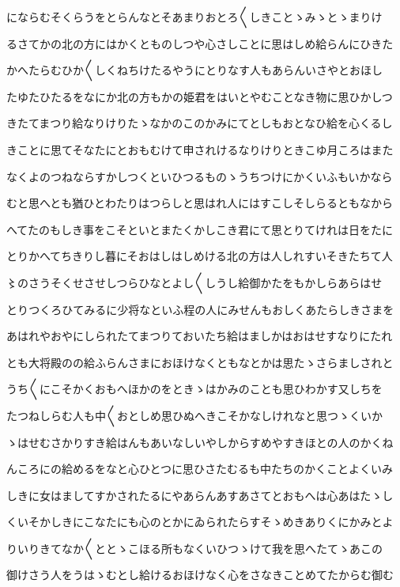 \documentclass[a4paper,11pt,landscape]{ltjtarticle}
\begin{document}
にならむそくらうをとらんなとそあまりおとろ〱しきことゝみゝとゝまりけ
\par\medskip
るさてかの北の方にはかくとものしつや心さしことに思はしめ給らんにひきた
\par\medskip
かへたらむひか〱しくねちけたるやうにとりなす人もあらんいさやとおほし
\par\medskip
たゆたひたるをなにか北の方もかの姫君をはいとやむことなき物に思ひかしつ
\par\medskip
きたてまつり給なりけりたゝなかのこのかみにてとしもおとなひ給を心くるし
\par\medskip
きことに思てそなたにとおもむけて申されけるなりけりときこゆ月ころはまた
\par\medskip
なくよのつねならすかしつくといひつるものゝうちつけにかくいふもいかなら
\par\medskip
むと思へとも猶ひとわたりはつらしと思はれ人にはすこしそしらるともなから
\par\medskip
へてたのもしき事をこそといとまたくかしこき君にて思とりてけれは日をたに
\par\medskip
とりかへてちきりし暮にそおはしはしめける北の方は人しれすいそきたちて人
\par\medskip
〻のさうそくせさせしつらひなとよし〱しうし給御かたをもかしらあらはせ
\par\medskip
とりつくろひてみるに少将なといふ程の人にみせんもおしくあたらしきさまを
\par\medskip
あはれやおやにしられたてまつりておいたち給はましかはおはせすなりにたれ
\par\medskip
とも大将殿のの給ふらんさまにおほけなくともなとかは思たゝさらましされと
\par\medskip
うち〱にこそかくおもへほかのをときゝはかみのことも思ひわかす又しちを
\par\medskip
たつねしらむ人も中〱おとしめ思ひぬへきこそかなしけれなと思つゝくいか
\par\medskip
ゝはせむさかりすき給はんもあいなしいやしからすめやすきほとの人のかくね
\par\medskip
んころにの給めるをなと心ひとつに思ひさたむるも中たちのかくことよくいみ
\par\medskip
しきに女はましてすかされたるにやあらんあすあさてとおもへは心あはたゝし
\par\medskip
くいそかしきにこなたにも心のとかにゐられたらすそゝめきありくにかみとよ
\par\medskip
りいりきてなか〱ととゝこほる所もなくいひつゝけて我を思へたてゝあこの
\par\medskip
御けさう人をうはゝむとし給けるおほけなく心をさなきことめてたからむ御む
\end{document}
